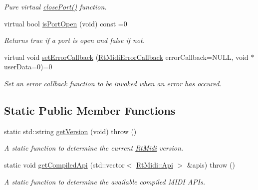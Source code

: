 \begin{DoxyCompactItemize}
\begin{DoxyCompactList}\small\item\em Pure virtual \hyperlink{class_rt_midi_a36125c4fa16550345b57f4a4927f5b4a}{close\+Port()} function. \end{DoxyCompactList}\item 
virtual bool \hyperlink{class_rt_midi_acb31c096d4911f29ce860e39a544e983}{is\+Port\+Open} (void) const  =0\hypertarget{class_rt_midi_acb31c096d4911f29ce860e39a544e983}{}\label{class_rt_midi_acb31c096d4911f29ce860e39a544e983}

\begin{DoxyCompactList}\small\item\em Returns true if a port is open and false if not. \end{DoxyCompactList}\item 
virtual void \hyperlink{class_rt_midi_aa6d6f2e0d06c64268c8898aa15f3a5df}{set\+Error\+Callback} (\hyperlink{_rt_midi_8h_a57641d3490f722c3efb9ee1c640e36bb}{Rt\+Midi\+Error\+Callback} error\+Callback=N\+U\+LL, void $\ast$user\+Data=0)=0
\begin{DoxyCompactList}\small\item\em Set an error callback function to be invoked when an error has occured. \end{DoxyCompactList}\end{DoxyCompactItemize}
\subsection*{Static Public Member Functions}
\begin{DoxyCompactItemize}
\item 
static std\+::string \hyperlink{class_rt_midi_a02abb166b49d2ab3f1cc52e64a192004}{get\+Version} (void)  throw ()\hypertarget{class_rt_midi_a02abb166b49d2ab3f1cc52e64a192004}{}\label{class_rt_midi_a02abb166b49d2ab3f1cc52e64a192004}

\begin{DoxyCompactList}\small\item\em A static function to determine the current \hyperlink{class_rt_midi}{Rt\+Midi} version. \end{DoxyCompactList}\item 
static void \hyperlink{class_rt_midi_a39204d17dea25683456b49db648bfb8b}{get\+Compiled\+Api} (std\+::vector$<$ \hyperlink{class_rt_midi_aac66af04a85fe5c5f07c360574a19406}{Rt\+Midi\+::\+Api} $>$ \&apis)  throw ()
\begin{DoxyCompactList}\small\item\em A static function to determine the available compiled M\+I\+DI A\+P\+Is. \end{DoxyCompactList}\end{DoxyCompactItemize}
